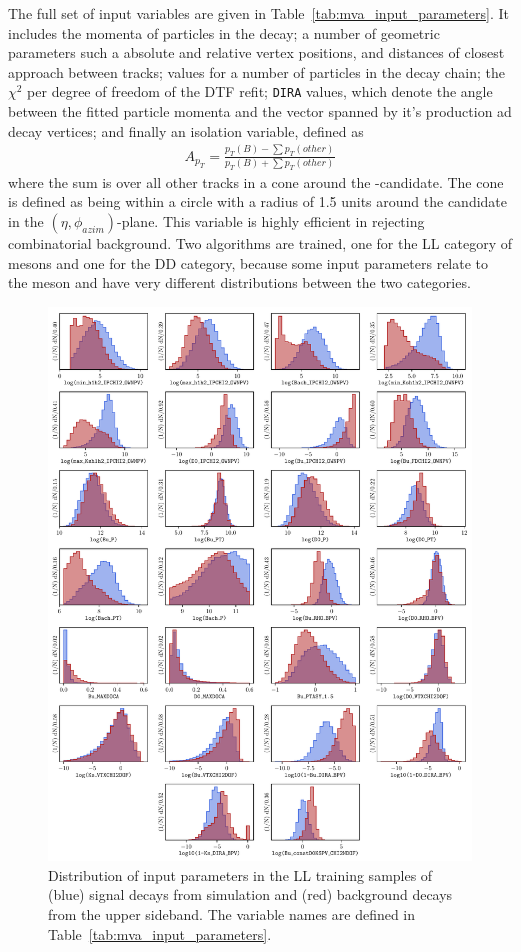 The full set of input variables are given in Table~\ref{tab:mva_input_parameters}. It includes the momenta of particles in the decay; a number of geometric parameters such a absolute and relative vertex positions, and distances of closest approach between tracks; \ipchisq values for a number of particles in the decay chain; the $\chi^2$ per degree of freedom of the DTF refit; \texttt{DIRA} values, which denote the angle between the fitted particle momenta and the vector spanned by it's production ad decay vertices; and finally an isolation variable, defined as
\begin{align}
    A_{p_T} = \frac{p_T(B)-\sum p_T(other)}{p_T(B)+\sum p_T(other)}
\end{align}
where the sum is over all other tracks in a cone around the \B-candidate. The cone is defined as being within a circle with a radius of 1.5 units around the \B candidate in the $(\eta, \phi_{azim})$-plane. This variable is highly efficient in rejecting combinatorial background.
Two algorithms are trained, one for the LL category of \KS mesons and one for the DD category, because some input parameters relate to the \KS meson and have very different distributions between the two categories. 



\begin{figure}[p!]
    \centering
    \includegraphics[width=0.95\columnwidth]{figures/analysis/input_param_LL.pdf}
    \caption{Distribution of input parameters in the LL training samples of (blue) signal decays from simulation and (red) background decays from the upper \B sideband. The variable names are defined in Table~\ref{tab:mva_input_parameters}.}
    \label{fig:input_variables_LL}
\end{figure}

